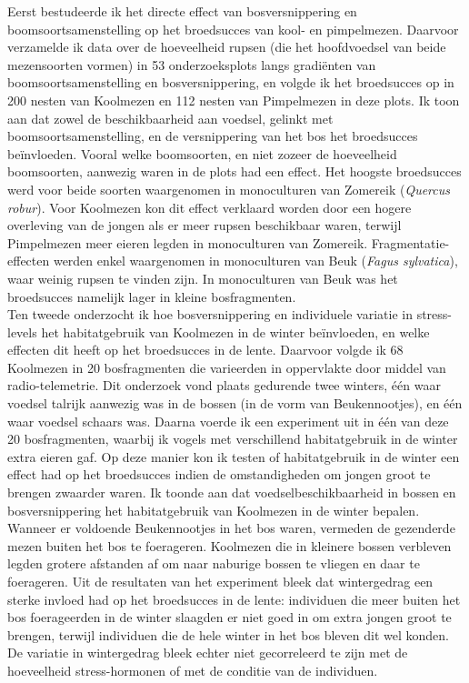\documentclass[10pt, twoside]{book} %
\begin{document}
Eerst bestudeerde ik het directe effect van bosversnippering en boomsoortsamenstelling op het broedsucces van kool- en pimpelmezen. Daarvoor verzamelde ik data over de hoeveelheid rupsen (die het hoofdvoedsel van beide mezensoorten vormen) in 53 onderzoeksplots langs gradi\"{e}nten van boomsoortsamenstelling en bosversnippering, en volgde ik het broedsucces op in 200 nesten van Koolmezen en 112 nesten van Pimpelmezen in deze plots. Ik toon aan dat zowel de beschikbaarheid aan voedsel, gelinkt met boomsoortsamenstelling, en de versnippering van het bos het broedsucces be\"{i}nvloeden. Vooral welke boomsoorten, en niet zozeer de hoeveelheid boomsoorten, aanwezig waren in de plots had een effect. Het hoogste broedsucces werd voor beide soorten waargenomen in monoculturen van Zomereik (\textit{Quercus robur}). Voor Koolmezen kon dit effect verklaard worden door een hogere overleving van de jongen als er meer rupsen beschikbaar waren, terwijl Pimpelmezen meer eieren legden in monoculturen van Zomereik. Fragmentatie-effecten werden enkel waargenomen in monoculturen van Beuk (\textit{Fagus sylvatica}), waar weinig rupsen te vinden zijn. In monoculturen van Beuk was het broedsucces namelijk lager in kleine bosfragmenten.\\

Ten tweede onderzocht ik hoe bosversnippering en individuele variatie in stress-levels het habitatgebruik van Koolmezen in de winter be\"{i}nvloeden, en welke effecten dit heeft op het broedsucces in de lente. Daarvoor volgde ik 68 Koolmezen in 20 bosfragmenten die varieerden in oppervlakte door middel van radio-telemetrie. Dit onderzoek vond plaats gedurende twee winters, \'{e}\'{e}n waar voedsel talrijk aanwezig was in de bossen (in de vorm van Beukennootjes), en \'{e}\'{e}n waar voedsel schaars was. Daarna voerde ik een experiment uit in \'{e}\'{e}n van deze 20 bosfragmenten, waarbij ik vogels met verschillend habitatgebruik in de winter extra eieren gaf. Op deze manier kon ik testen of habitatgebruik in de winter een effect had op het broedsucces indien de omstandigheden om jongen groot te brengen zwaarder waren. Ik toonde aan dat voedselbeschikbaarheid in bossen en bosversnippering het habitatgebruik van Koolmezen in de winter bepalen. Wanneer er voldoende Beukennootjes in het bos waren, vermeden de gezenderde mezen buiten het bos te foerageren. Koolmezen die in kleinere bossen verbleven legden grotere afstanden af om naar naburige bossen te vliegen en daar te foerageren. Uit de resultaten van het experiment bleek dat wintergedrag een sterke invloed had op het broedsucces in de lente: individuen die meer buiten het bos foerageerden in de winter slaagden er niet goed in om extra jongen groot te brengen, terwijl individuen die de hele winter in het bos bleven dit wel konden. De variatie in wintergedrag bleek echter niet gecorreleerd te zijn met de hoeveelheid stress-hormonen of met de conditie van de individuen.\\
\end{document}
